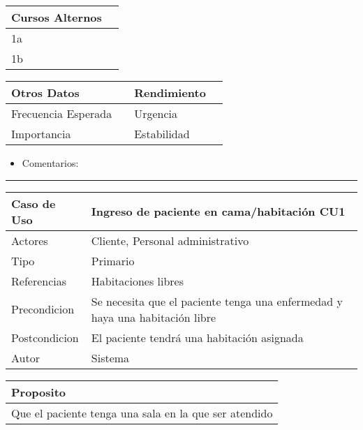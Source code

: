 \documentclass[10pt,a4paper,spanish]{report}
\begin{document}
\begin{center}
\begin{tabular}{ll}
\hline
Cursos Alternos & \\
\hline
1a & \\
\hline
1b & \\
\hline
\end{tabular}
\end{center}


\begin{center}
\begin{tabular}{llll}
\hline
Otros Datos &  & Rendimiento & \\
\hline
Frecuencia Esperada &  & Urgencia & \\
\hline
Importancia &  & Estabilidad & \\
\hline
\end{tabular}
\end{center}


\begin{itemize}
\item Comentarios:
\end{itemize}

\noindent\rule{\textwidth}{0.5pt}








\begin{center}
\begin{tabular}{ll}
\hline
Caso de Uso & Ingreso de paciente en cama/habitación      \vline CU1\\
\hline
Actores & Cliente, Personal administrativo\\
\hline
Tipo & Primario\\
\hline
Referencias & Habitaciones libres\\
\hline
Precondicion & Se necesita que el paciente tenga una enfermedad y haya una habitación libre\\
\hline
Postcondicion & El paciente tendrá una habitación asignada\\
\hline
Autor & Sistema\\
\hline
\end{tabular}
\end{center}


\begin{center}
\begin{tabular}{l}
\hline
Proposito\\
\hline
Que el paciente tenga una sala en la que ser atendido\\
\hline
\end{tabular}
\end{center}
\end{document}
